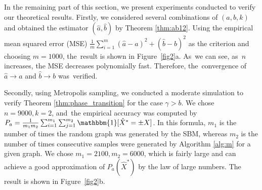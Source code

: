 \documentclass[entropy,article,accept,moreauthors,pdftex]{Definitions/mdpi}
\newcommand{\1}{\mathbbm{1}}
\begin{document}
\begin{paracol}{2}
In the remaining part of this section, we present  experiments conducted to verify our theoretical results.
Firstly, we considered several combinations of $(a,b,k)$ and obtained the estimator $(\hat{a}, \hat{b})$ by Theorem \ref{thm:ab12}. Using
the empirical mean squared error (MSE) $\frac{1}{m} \sum_{i=1}^m (\hat{a}-a)^2 + (\hat{b}-b)^2$ as the criterion
and choosing $m=1000$, the~result is shown in Figure~\ref{fig2}a. As~we can see, as~$n$ increases, the MSE decreases polynomially fast. Therefore, the~convergence
of $\hat{a} \to a$ and $\hat{b} \to b$ was~verified.

Secondly, using Metropolis sampling, we conducted a moderate simulation to verify Theorem \ref{thm:phase_transition} for the case $\gamma > b$.
We chose $n=9000, k=2$, and~the empirical accuracy was computed by $P_a = \frac{1}{m_1m_2}\sum_{i=1}^{m_1} \sum_{j=1}^{m_2} \mathbbm{1}[\hat{X}^* = \pm X]$.
In this formula, $m_1$ is the number of times   the random graph was generated by the SBM,
whereas $m_2$ is the number of times  consecutive samples were generated by Algorithm \ref{alg:m} for a given graph.
We chose $m_1=2100,m_2=6000$, which is fairly large and can achieve a good approximation of $P_a(\hat{X}^*)$ by the law of large numbers.
The result is shown in Figure~\ref{fig2}b.
\end{paracol}
\nointerlineskip
\end{document}
